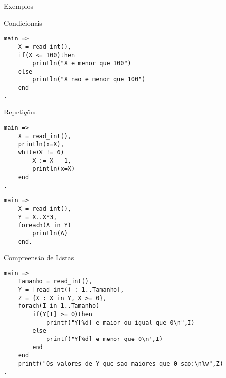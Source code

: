 \begin{frame}{Exemplos}
    
    \begin{block}{Condicionais}
        \begin{lstlisting}[frame=single]
main =>
    X = read_int(),
    if(X <= 100)then
        println("X e menor que 100")
    else
        println("X nao e menor que 100")
    end
.
        \end{lstlisting}
    
    \end{block}
    
    \framebreak
    
    \begin{block}{Repetições}
    
   \begin{lstlisting}[frame=single]
main =>
    X = read_int(),
    println(x=X),
    while(X != 0)
        X := X - 1,
        println(x=X)
    end
.
   \end{lstlisting}
        
   \begin{lstlisting}[frame=single]
main =>
    X = read_int(),
    Y = X..X*3,
    foreach(A in Y)
        println(A)
    end.
        \end{lstlisting}
    
    \end{block}
    
    \framebreak
    
    \begin{block}{Compreensão de Listas}
       
       \begin{lstlisting}[frame=single]
main => 
    Tamanho = read_int(),
    Y = [read_int() : 1..Tamanho],
    Z = {X : X in Y, X >= 0},
    forach(I in 1..Tamanho)
        if(Y[I] >= 0)then
            printf("Y[%d] e maior ou igual que 0\n",I)
        else
            printf("Y[%d] e menor que 0\n",I)
        end
    end
    printf("Os valores de Y que sao maiores que 0 sao:\n%w",Z)
.
       \end{lstlisting} 
       
    \end{block}
    
\end{frame}


